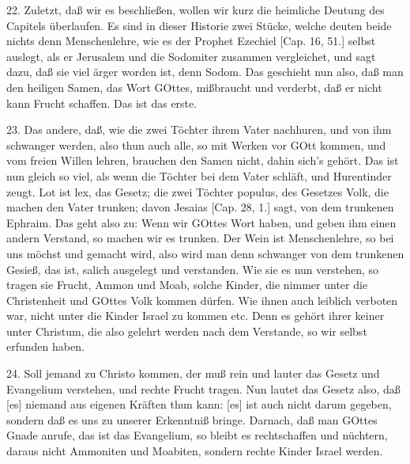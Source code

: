 22. Zuletzt, daß wir es beschließen, wollen wir kurz die heimliche Deutung des Capitels überlaufen. Es sind in dieser Historie zwei Stücke, welche deuten beide nichts denn Menschenlehre, wie es der Prophet Ezechiel [Cap. 16, 51.] selbst auslegt, als er Jerusalem und die Sodomiter zusammen vergleichet, und sagt dazu, daß sie viel ärger worden ist, denn Sodom. Das geschieht nun also, daß man den heiligen Samen, das Wort GOttes, mißbraucht und verderbt, daß er nicht kann Frucht schaffen. Das ist das erste.

23. Das andere, daß, wie die zwei Töchter ihrem Vater nachhuren, und von ihm schwanger werden, also thun auch alle, so mit Werken vor GOtt kommen, und vom freien Willen lehren, brauchen den Samen nicht, dahin sich’s gehört. Das ist nun gleich so viel, als wenn die Töchter bei dem Vater schläft, und Hurentinder zeugt. Lot ist lex, das Gesetz; die zwei Töchter populus, des Gesetzes Volk, die machen den Vater trunken; davon Jesaias [Cap. 28, 1.] sagt, von dem trunkenen Ephraim. Das geht also zu: Wenn wir GOttes Wort haben, und geben ihm einen andern Verstand, so machen wir es trunken. Der Wein ist Menschenlehre, so bei uns
möchst und gemacht wird, also wird man denn schwanger von dem trunkenen Gesieß, das ist, salich ausgelegt und verstanden. Wie sie es nun verstehen, so tragen sie Frucht, Ammon und Moab, solche Kinder, die nimmer unter die Christenheit und GOttes Volk kommen dürfen. Wie ihnen auch leiblich verboten war, nicht unter die Kinder Israel zu kommen etc. Denn es gehört ihrer keiner unter Christum, die also gelehrt werden nach dem Verstande, so wir selbst erfunden haben.

24. Soll jemand zu Christo kommen, der muß rein und lauter das Gesetz und Evangelium verstehen, und rechte Frucht tragen. Nun lautet das Gesetz also, daß [es] niemand aus eigenen Kräften thun kann: [es] ist auch nicht darum gegeben, sondern daß es uns zu unserer Erkenntniß bringe. Darnach, daß man GOttes Gnade anrufe, das ist das Evangelium, so bleibt es rechtschaffen und nüchtern, daraus nicht Ammoniten und Moabiten, sondern rechte Kinder Israel werden.

